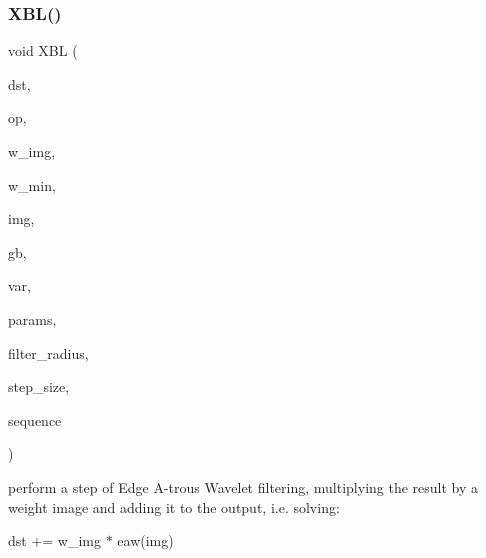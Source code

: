 \subsubsection{\texorpdfstring{X\+B\+L()}{XBL()}}
{\footnotesize\ttfamily void X\+BL (\begin{DoxyParamCaption}\item[{\hyperlink{struct_f_buffer_channel_view}{F\+Buffer\+Channel\+View}}]{dst,  }\item[{const Filter\+Op}]{op,  }\item[{const \hyperlink{struct_f_buffer_channel_view}{F\+Buffer\+Channel\+View}}]{w\+\_\+img,  }\item[{const float}]{w\+\_\+min,  }\item[{const \hyperlink{struct_f_buffer_channel_view}{F\+Buffer\+Channel\+View}}]{img,  }\item[{const \hyperlink{struct_g_buffer_view}{G\+Buffer\+View}}]{gb,  }\item[{const float $\ast$}]{var,  }\item[{const \hyperlink{struct_x_b_l_params}{X\+B\+L\+Params}}]{params,  }\item[{const uint32}]{filter\+\_\+radius,  }\item[{const uint32}]{step\+\_\+size,  }\item[{const \hyperlink{struct_tiled_sequence_view}{Tiled\+Sequence\+View}}]{sequence }\end{DoxyParamCaption})}

perform a step of Edge A-\/trous Wavelet filtering, multiplying the result by a weight image and adding it to the output, i.\+e. solving\+:

dst += w\+\_\+img $\ast$ eaw(img) 